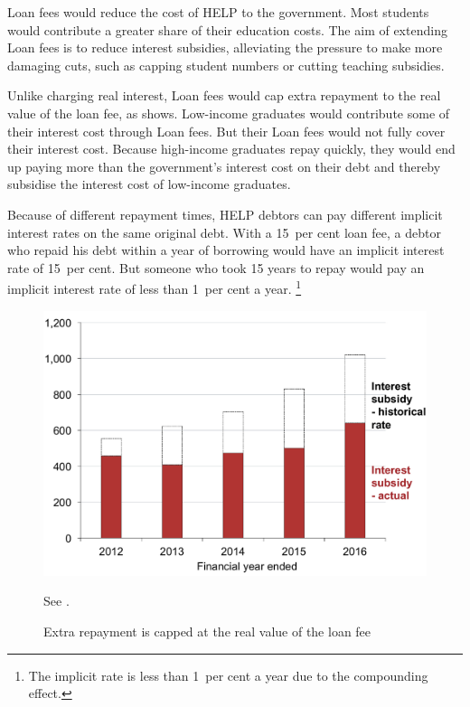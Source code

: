 \documentclass{grattan}
\begin{document}
\Gls{Loan fees} would reduce the cost of \gls{HELP} to the government.
Most students would contribute a greater share of their education costs.
The aim of extending \gls{Loan fees} is to reduce interest subsidies, alleviating the pressure to make more damaging cuts, such as capping student numbers or cutting teaching subsidies.

Unlike charging real interest, \gls{Loan fees} would cap extra repayment to the real value of the loan fee, as  shows. Low-income graduates would contribute some of their interest cost through \gls{Loan fees}.
But their \gls{Loan fees} would not fully cover their interest cost.
Because high-income graduates repay quickly, they would end up paying more than the government's interest cost on their debt and thereby subsidise the interest cost of low-income graduates.

Because of different repayment times, \gls{HELP} debtors can pay different implicit interest rates on the same original debt.
With a 15~per cent loan fee, a debtor who repaid his debt within a year of borrowing would have an implicit interest rate of 15~per cent.
But someone who took 15 years to repay would pay an implicit interest rate of less than 1~per cent a year.%
   \footnote{The implicit rate is less than 1~per cent a year due to the compounding effect.}

\begin{figure}
\caption{Extra repayment is capped at the real value of the loan fee}\label{fig:fig22-extra-repayment-capped-at-real-level-of-loan-fee}

\includegraphics[page=22]{atlas/Chartpack.pdf}

{See .}
\end{figure}
\end{document}
